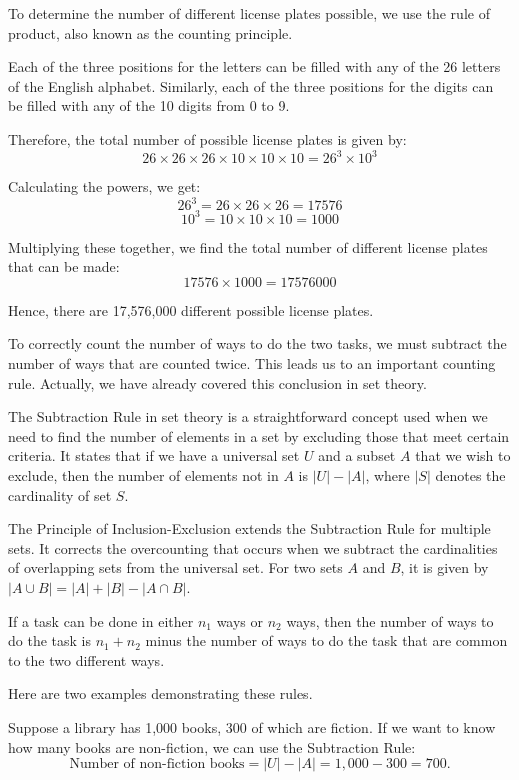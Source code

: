         \begin{solution}
        To determine the number of different license plates possible, we use the rule of product, also known as the counting principle. 
        
        Each of the three positions for the letters can be filled with any of the 26 letters of the English alphabet. Similarly, each of the three positions for the digits can be filled with any of the 10 digits from 0 to 9.
        
        Therefore, the total number of possible license plates is given by:
        \[ 26 \times 26 \times 26 \times 10 \times 10 \times 10 = 26^3 \times 10^3 \]
        
        Calculating the powers, we get:
        \[ 26^3 = 26 \times 26 \times 26 = 17576 \]
        \[ 10^3 = 10 \times 10 \times 10 = 1000 \]
        
        Multiplying these together, we find the total number of different license plates that can be made:
        \[ 17576 \times 1000 = 17576000 \]
        
        Hence, there are 17,576,000 different possible license plates.
        \end{solution}
        
        To correctly count the number of ways to do the two tasks, we must subtract the number of ways that are counted twice. This leads us to an important counting rule.
        Actually, we have already covered this conclusion in set theory.

        The Subtraction Rule in set theory is a straightforward concept used when we need to find the number of elements in a set by excluding those that meet certain criteria. It states that if we have a universal set \( U \) and a subset \( A \) that we wish to exclude, then the number of elements not in \( A \) is \( |U| - |A| \), where \( |S| \) denotes the cardinality of set \( S \).

        The Principle of Inclusion-Exclusion extends the Subtraction Rule for multiple sets. It corrects the overcounting that occurs when we subtract the cardinalities of overlapping sets from the universal set. For two sets \( A \) and \( B \), it is given by \( |A \cup B| = |A| + |B| - |A \cap B| \).
        
        \begin{theorem}
            If a task can be done in either $n_1$ ways or $n_2$ ways, then the number of ways to do the task is $n_1+n_2$ minus the number of ways to do the task that are common to the two different ways.
        \end{theorem}
        Here are two examples demonstrating these rules.
        \begin{example}
            Suppose a library has 1,000 books, 300 of which are fiction. If we want to know how many books are non-fiction, we can use the Subtraction Rule:
            $$ \text{Number of non-fiction books} = |U| - |A| = 1,000 - 300 = 700. $$
        \end{example}

